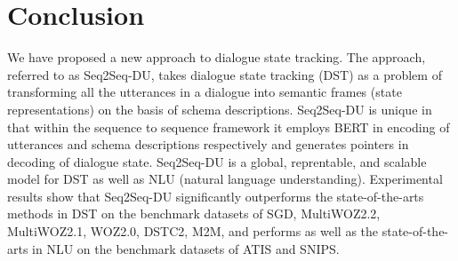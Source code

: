\documentclass[11pt]{article}
\begin{document}
\begin{table}[!h]
\centering
{}
\caption{Accuracies of Seq2Seq-DU and baselines with respect to categorical and non-categorical slots on SGD and MultiWOZ2.2.}  
\label{tab:SGD_MultiWOZ2.2_v2}
\end{table}


\section{Conclusion}
We have proposed a new approach to dialogue state tracking. The approach, referred to as Seq2Seq-DU, takes dialogue state tracking (DST) as a problem of transforming all the utterances in a dialogue into semantic frames (state representations) on the basis of schema descriptions. 
Seq2Seq-DU is unique in that within the sequence to sequence framework it employs  BERT in encoding of utterances and schema descriptions respectively and generates pointers in decoding of dialogue state. Seq2Seq-DU is a global, reprentable, and scalable model for DST as well as NLU (natural language understanding).  Experimental results show that Seq2Seq-DU significantly outperforms the state-of-the-arts methods in DST on the benchmark datasets of SGD, MultiWOZ2.2, MultiWOZ2.1, WOZ2.0, DSTC2, M2M, and performs as well as the state-of-the-arts in NLU on the benchmark datasets of ATIS and SNIPS. 





\end{document}
